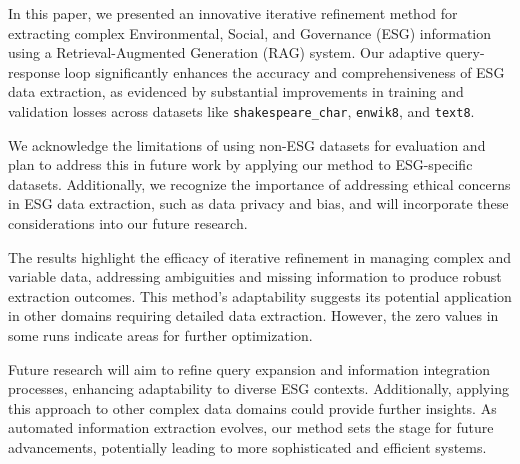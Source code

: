 \documentclass{article} %
\begin{document}
In this paper, we presented an innovative iterative refinement method for extracting complex Environmental, Social, and Governance (ESG) information using a Retrieval-Augmented Generation (RAG) system. Our adaptive query-response loop significantly enhances the accuracy and comprehensiveness of ESG data extraction, as evidenced by substantial improvements in training and validation losses across datasets like \texttt{shakespeare\_char}, \texttt{enwik8}, and \texttt{text8}.

We acknowledge the limitations of using non-ESG datasets for evaluation and plan to address this in future work by applying our method to ESG-specific datasets. Additionally, we recognize the importance of addressing ethical concerns in ESG data extraction, such as data privacy and bias, and will incorporate these considerations into our future research.

The results highlight the efficacy of iterative refinement in managing complex and variable data, addressing ambiguities and missing information to produce robust extraction outcomes. This method's adaptability suggests its potential application in other domains requiring detailed data extraction. However, the zero values in some runs indicate areas for further optimization.

Future research will aim to refine query expansion and information integration processes, enhancing adaptability to diverse ESG contexts. Additionally, applying this approach to other complex data domains could provide further insights. As automated information extraction evolves, our method sets the stage for future advancements, potentially leading to more sophisticated and efficient systems.



\end{document}
